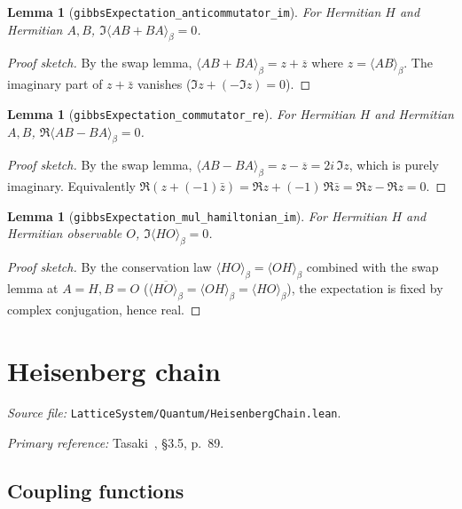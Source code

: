 \documentclass[a4paper,11pt]{article}
\newtheorem{lemma}[theorem]{Lemma}
\begin{document}
\begin{lemma}[\texttt{gibbsExpectation\_anticommutator\_im}]
For Hermitian $H$ and Hermitian $A, B$,
$\Im\langle A B + B A \rangle_\beta = 0$.
\end{lemma}

\begin{proof}[Proof sketch]
By the swap lemma, $\langle A B + B A \rangle_\beta = z + \overline{z}$
where $z = \langle A B \rangle_\beta$. The imaginary part of $z + \bar z$
vanishes ($\Im z + (-\Im z) = 0$).
\end{proof}

\begin{lemma}[\texttt{gibbsExpectation\_commutator\_re}]
For Hermitian $H$ and Hermitian $A, B$,
$\Re\langle A B - B A \rangle_\beta = 0$.
\end{lemma}

\begin{proof}[Proof sketch]
By the swap lemma, $\langle A B - B A \rangle_\beta = z - \overline{z}
= 2 i\,\Im z$, which is purely imaginary. Equivalently
$\Re(z + (-1)\bar z) = \Re z + (-1)\,\Re\bar z = \Re z - \Re z = 0$.
\end{proof}

\begin{lemma}[\texttt{gibbsExpectation\_mul\_hamiltonian\_im}]
For Hermitian $H$ and Hermitian observable $O$,
$\Im\langle H O \rangle_\beta = 0$.
\end{lemma}

\begin{proof}[Proof sketch]
By the conservation law $\langle H O \rangle_\beta = \langle O H \rangle_\beta$
combined with the swap lemma at $A = H, B = O$
($\overline{\langle H O \rangle_\beta} = \langle O H \rangle_\beta = \langle H O \rangle_\beta$),
the expectation is fixed by complex conjugation, hence real.
\end{proof}

\section{Heisenberg chain}
\label{sec:heisenberg-chain}

\emph{Source file:} \texttt{LatticeSystem/Quantum/HeisenbergChain.lean}.

\emph{Primary reference:} Tasaki~\cite{Tasaki:QMB}, §3.5, p.~89.

\subsection{Coupling functions}
\end{document}
